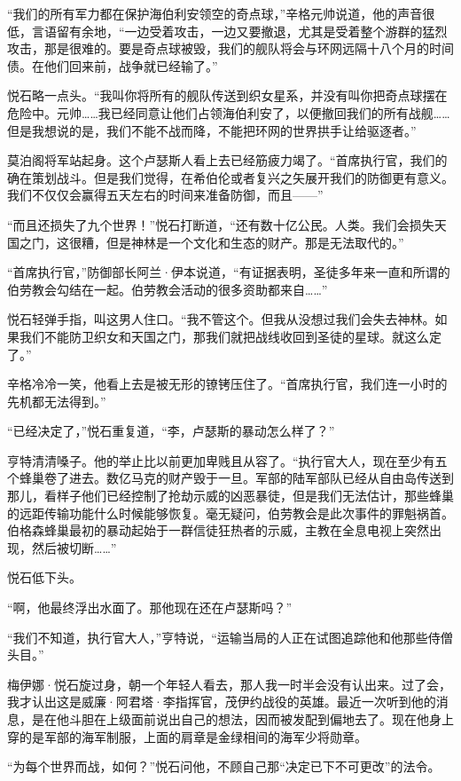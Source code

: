 \documentclass[AutoFakeBold=true]{book}
\begin{document}
``我们的所有军力都在保护海伯利安领空的奇点球，''辛格元帅说道，他的声音很低，言语留有余地，``一边受着攻击，一边又要撤退，尤其是受着整个游群的猛烈攻击，那是很难的。要是奇点球被毁，我们的舰队将会与环网远隔十八个月的时间债。在他们回来前，战争就已经输了。''

悦石略一点头。``我叫你将所有的舰队传送到织女星系，并没有叫你把奇点球摆在危险中。元帅……我已经同意让他们占领海伯利安了，以便撤回我们的所有战舰……但是我想说的是，我们不能不战而降，不能把环网的世界拱手让给驱逐者。''

莫泊阁将军站起身。这个卢瑟斯人看上去已经筋疲力竭了。``首席执行官，我们的确在策划战斗。但是我们觉得，在希伯伦或者复兴之矢展开我们的防御更有意义。我们不仅仅会赢得五天左右的时间来准备防御，而且——''

``而且还损失了九个世界！''悦石打断道，``还有数十亿公民。人类。我们会损失天国之门，这很糟，但是神林是一个文化和生态的财产。那是无法取代的。''

``首席执行官，''防御部长阿兰·伊本说道，``有证据表明，圣徒多年来一直和所谓的伯劳教会勾结在一起。伯劳教会活动的很多资助都来自……''

悦石轻弹手指，叫这男人住口。``我不管这个。但我从没想过我们会失去神林。如果我们不能防卫织女和天国之门，那我们就把战线收回到圣徒的星球。就这么定了。''

辛格冷冷一笑，他看上去是被无形的镣铐压住了。``首席执行官，我们连一小时的先机都无法得到。''

``已经决定了，''悦石重复道，``李，卢瑟斯的暴动怎么样了？''

亨特清清嗓子。他的举止比以前更加卑贱且从容了。``执行官大人，现在至少有五个蜂巢卷了进去。数亿马克的财产毁于一旦。军部的陆军部队已经从自由岛传送到那儿，看样子他们已经控制了抢劫示威的凶恶暴徒，但是我们无法估计，那些蜂巢的远距传输功能什么时候能够恢复。毫无疑问，伯劳教会是此次事件的罪魁祸首。伯格森蜂巢最初的暴动起始于一群信徒狂热者的示威，主教在全息电视上突然出现，然后被切断……''

悦石低下头。

``啊，他最终浮出水面了。那他现在还在卢瑟斯吗？''

``我们不知道，执行官大人，''亨特说，``运输当局的人正在试图追踪他和他那些侍僧头目。''

梅伊娜·悦石旋过身，朝一个年轻人看去，那人我一时半会没有认出来。过了会，我才认出这是威廉·阿君塔·李指挥官，茂伊约战役的英雄。最近一次听到他的消息，是在他斗胆在上级面前说出自己的想法，因而被发配到偏地去了。现在他身上穿的是军部的海军制服，上面的肩章是金绿相间的海军少将勋章。

``为每个世界而战，如何？''悦石问他，不顾自己那``决定已下不可更改''的法令。
\end{document}
